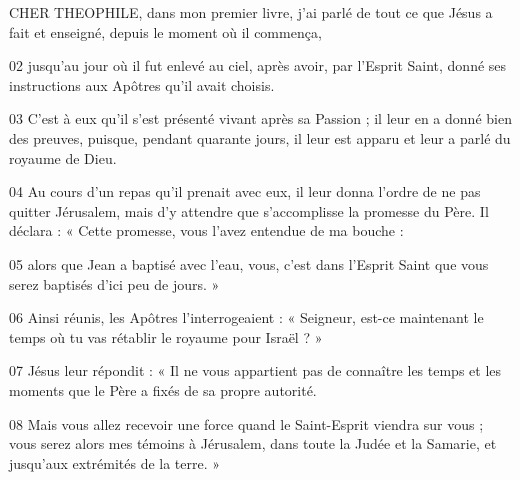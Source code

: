 CHER THEOPHILE, dans mon premier livre, j’ai parlé de tout ce que Jésus a fait et enseigné, depuis le moment où il commença,

02 jusqu’au jour où il fut enlevé au ciel, après avoir, par l’Esprit Saint, donné ses instructions aux Apôtres qu’il avait choisis.

03 C’est à eux qu’il s’est présenté vivant après sa Passion ; il leur en a donné bien des preuves, puisque, pendant quarante jours, il leur est apparu et leur a parlé du royaume de Dieu.

04 Au cours d’un repas qu’il prenait avec eux, il leur donna l’ordre de ne pas quitter Jérusalem, mais d’y attendre que s’accomplisse la promesse du Père. Il déclara : « Cette promesse, vous l’avez entendue de ma bouche :

05 alors que Jean a baptisé avec l’eau, vous, c’est dans l’Esprit Saint que vous serez baptisés d’ici peu de jours. »

06 Ainsi réunis, les Apôtres l’interrogeaient : « Seigneur, est-ce maintenant le temps où tu vas rétablir le royaume pour Israël ? »

07 Jésus leur répondit : « Il ne vous appartient pas de connaître les temps et les moments que le Père a fixés de sa propre autorité.

08 Mais vous allez recevoir une force quand le Saint-Esprit viendra sur vous ; vous serez alors mes témoins à Jérusalem, dans toute la Judée et la Samarie, et jusqu’aux extrémités de la terre. »